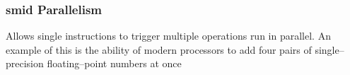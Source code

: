 \documentclass[../bryant_comp_sys.tex]{subfiles}
\begin{document}
        \subsubsection{\Gls{smid} Parallelism}
            \begin{outline}
                \1 Allows single instructions to trigger multiple operations run in parallel.
                \1 An example of this is the ability of modern processors to add four pairs of single--precision floating--point numbers at once
            \end{outline}
\end{document}
